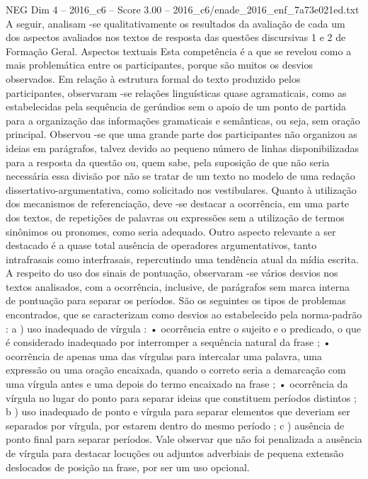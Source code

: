 \begin{textsample}{NEG Dim 4 – 2016\_c6 – Score 3.00 – 2016\_c6/enade\_2016\_enf\_7a73e021ed.txt}
A seguir, analisam -se qualitativamente os resultados da avaliação de cada um dos aspectos avaliados nos textos de resposta das questões discursivas 1 e 2 de Formação Geral.
Aspectos textuais Esta competência é a que se revelou como a mais problemática entre os participantes, porque são muitos os desvios observados.
Em relação à estrutura formal do texto produzido pelos participantes, observaram -se relações linguísticas quase agramaticais, como as estabelecidas pela sequência de gerúndios sem o apoio de um ponto de partida para a organização das informações gramaticais e semânticas, ou seja, sem oração principal.
Observou -se que uma grande parte dos participantes não organizou as ideias em parágrafos, talvez devido ao pequeno número de linhas disponibilizadas para a resposta da questão ou, quem sabe, pela suposição de que não seria necessária essa divisão por não se tratar de um texto no modelo de uma redação dissertativo-argumentativa, como solicitado nos vestibulares.
Quanto à utilização dos mecanismos de referenciação, deve -se destacar a ocorrência, em uma parte dos textos, de repetições de palavras ou expressões sem a utilização de termos sinônimos ou pronomes, como seria adequado.
Outro aspecto relevante a ser destacado é a quase total ausência de operadores argumentativos, tanto intrafrasais como interfrasais, repercutindo uma tendência atual da mídia escrita.
A respeito do uso dos sinais de pontuação, observaram -se vários desvios nos textos analisados, com a ocorrência, inclusive, de parágrafos sem marca interna de pontuação para separar os períodos.
São os seguintes os tipos de problemas encontrados, que se caracterizam como desvios ao estabelecido pela norma-padrão : a ) uso inadequado de vírgula : • ocorrência entre o sujeito e o predicado, o que é considerado inadequado por interromper a sequência natural da frase ; • ocorrência de apenas uma das vírgulas para intercalar uma palavra, uma expressão ou uma oração encaixada, quando o correto seria a demarcação com uma vírgula antes e uma depois do termo encaixado na frase ; • ocorrência da vírgula no lugar do ponto para separar ideias que constituem períodos distintos ; b ) uso inadequado de ponto e vírgula para separar elementos que deveriam ser separados por vírgula, por estarem dentro do mesmo período ; c ) ausência de ponto final para separar períodos.
Vale observar que não foi penalizada a ausência de vírgula para destacar locuções ou adjuntos adverbiais de pequena extensão deslocados de posição na frase, por ser um uso opcional.

\end{textsample}

